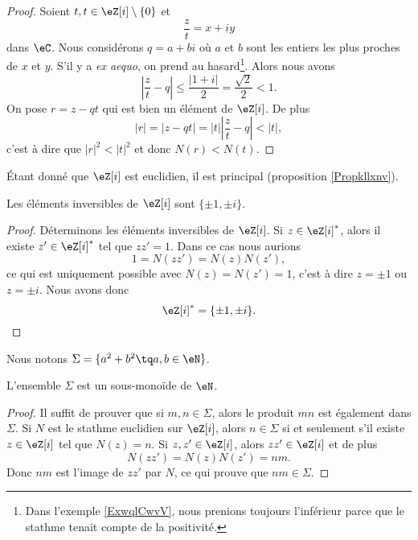 \begin{proof}
    Soient \( t,t\in \eZ[i]\setminus\{ 0 \}\) et 
    \begin{equation}
        \frac{ z }{ t }=x+iy
    \end{equation}
    dans \( \eC\). Nous considérons \( q=a+bi\) où \( a\) et \( b\) sont les entiers les plus proches de \( x\) et \( y\). S'il y a \emph{ex aequo}, on prend au hasard\footnote{Dans l'exemple \ref{ExwqlCwvV}, nous prenions toujours l'inférieur parce que le stathme tenait compte de la positivité.}. Alors nous avons
    \begin{equation}
        | \frac{ z }{ t }-q |\leq \frac{ | 1+i | }{ 2 }=\frac{ \sqrt{2} }{2}<1.
    \end{equation}
    On pose \( r=z-qt\) qui est bien un élément de \( \eZ[i]\). De plus
    \begin{equation}
        | r |=| z-qt |=| t | |\frac{ z }{ t }-q |<| t |,
    \end{equation}
    c'est à dire que \( | r |^2<| t |^2\) et donc \( N(r)<N(t)\). 
\end{proof}
Étant donné que \( \eZ[i]\) est euclidien, il est principal (proposition \ref{Propkllxnv}).

\begin{lemma}   \label{LemBMEIiiV}
    Les éléments inversibles de \( \eZ[i]\) sont \( \{ \pm 1,\pm i \}\).
\end{lemma}

\begin{proof}

    Déterminons les éléments inversibles de \( \eZ[i]\). Si \( z\in \eZ[i]^*\), alors il existe \( z'\in \eZ[i]^*\) tel que \( zz'=1\). Dans ce cas nous aurions
    \begin{equation}
        1=N(zz')=N(z)N(z'),
    \end{equation}
    ce qui est uniquement possible avec \( N(z)=N(z')=1\), c'est à dire \( z=\pm 1\) ou \( z=\pm i\). Nous avons donc
    \begin{equation}
        \eZ[i]^*=\{ \pm 1,\pm i \}.
    \end{equation}
\end{proof}

Nous notons \( \Sigma=\{ a^2+b^2\tq a,b\in \eN \}\). 
\begin{lemma}   \label{LemIBDPzMB}
    L'ensemble \( \Sigma\) est un sous-monoïde de \( \eN\).
\end{lemma}

\begin{proof}
    Il suffit de prouver que si \( m,n\in \Sigma\), alors le produit \( mn\) est également dans \( \Sigma\). Si \( N\) est le stathme euclidien sur \( \eZ[i]\), alors  \( n\in \Sigma\) si et seulement s'il existe \( z\in \eZ[i]\) tel que \( N(z)=n\). Si \( z,z'\in \eZ[i]\), alors \( zz'\in \eZ[i]\) et de plus
    \begin{equation}
        N(zz')=N(z)N(z')=nm.
    \end{equation}
    Donc \( nm\) est l'image de \( zz'\) par \( N\), ce qui prouve que \( nm\in \Sigma\).
\end{proof}

